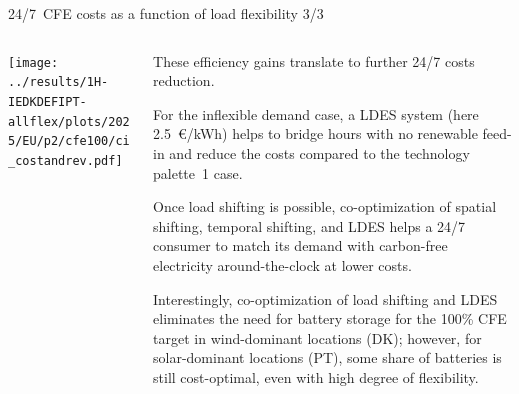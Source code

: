\begin{frame}{24/7~CFE costs as a function of load flexibility 3/3}

  {\footnotesize
  \vspace{0.2cm}
  
  \begin{columns}[T]

  \begin{column}{9cm}
  \centering
  \texttt{[image: ../results/1H-IEDKDEFIPT-allflex/plots/2025/EU/p2/cfe100/ci\_costandrev.pdf]}
  \end{column}

  \begin{column}{6cm}
  These efficiency gains translate to further 24/7 costs reduction.
  
  \vspace{0.1cm} 
  For the inflexible demand case, a LDES system (here 2.5~€/kWh) helps to bridge hours with no renewable feed-in and reduce the costs compared to the technology palette~1 case. 

  \vspace{0.1cm} 
  Once load shifting is possible, co-optimization of spatial shifting, temporal shifting, and LDES helps a 24/7 consumer to match its demand with carbon-free electricity around-the-clock at lower costs.

  \vspace{0.1cm} 
  Interestingly, co-optimization of load shifting and LDES eliminates the need for battery storage for the 100\% CFE target in wind-dominant locations (DK); however, for solar-dominant locations (PT), some share of batteries is still cost-optimal, even with high degree of flexibility.

  \end{column}
  \end{columns}
  }
\end{frame}



